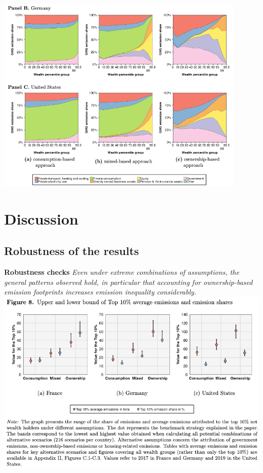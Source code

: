 \documentclass[10pt]{beamer}
\begin{document}
\begin{frame}{\subsecname}
    \begin{center}
        \includegraphics[width=0.9\textwidth]{../Figures/F72.png}
    \end{center}
\end{frame}

\section{Discussion}

\begin{frame}{\secname}
    \tableofcontents[currentsection, hideothersubsections, sections=\value{section}]
\end{frame}

\subsection{Robustness of the results}
\begin{frame}{\subsecname}
    \textbf{Robustness checks}
    \textit{Even under extreme combinations of assumptions, the general patterns observed hold, in particular that accounting for ownership-based emission footprints increases emission inequality considerably.}
    \includegraphics[width=1\linewidth]{../Figures/Figure_8.png}
\end{frame}
\end{document}

